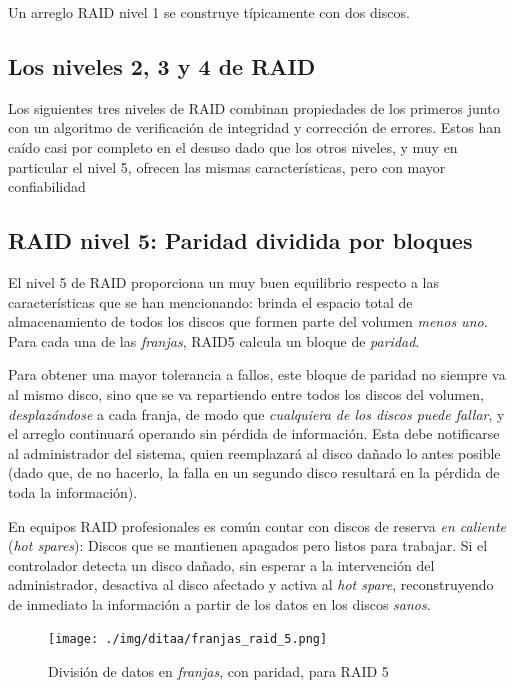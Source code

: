 \documentclass[11pt,fleqn]{book} %
\begin{document}
Un arreglo RAID nivel 1 se construye típicamente con dos discos.
\subsection{Los niveles 2, 3 y 4 de RAID}
\label{sec-10-2-3}


Los siguientes tres niveles de RAID combinan propiedades de los
primeros junto con un algoritmo de verificación de integridad y
corrección de errores. Estos han caído casi por completo en el desuso
dado que los otros niveles, y muy en particular el nivel 5, ofrecen
las mismas características, pero con mayor confiabilidad
\subsection{RAID nivel 5: Paridad dividida por bloques}
\label{sec-10-2-4}


El nivel 5 de RAID proporciona un muy buen equilibrio respecto a las
características que se han mencionando:  brinda el espacio total
de almacenamiento de todos los discos que formen parte del volumen
\emph{menos uno}. Para cada una de las \emph{franjas}, RAID5 calcula un bloque
de \emph{paridad}.

Para obtener una mayor tolerancia a fallos, este bloque de paridad no siempre va al mismo
disco, sino que se va repartiendo entre todos los discos del volumen,
\emph{desplazándose} a cada franja, de modo que \emph{cualquiera de los discos puede fallar}, y el arreglo continuará operando sin pérdida de
información. Esta debe notificarse al administrador del sistema,
quien reemplazará al disco dañado lo antes posible (dado que, de no
hacerlo, la falla en un segundo disco resultará en la pérdida de toda
la información).

En equipos RAID profesionales es común contar con discos de reserva
\emph{en caliente} (\emph{hot spares}): Discos que se mantienen apagados pero
listos para trabajar. Si el controlador detecta un disco dañado, sin
esperar a la intervención del administrador, desactiva al disco
afectado y activa al \emph{hot spare}, reconstruyendo de inmediato la
información a partir de los datos en los discos \emph{sanos}.

\begin{figure}[htb]
\centering
\texttt{[image: ./img/ditaa/franjas\_raid\_5.png]}
\caption{\label{FS_FIS_franjas_raid_5}División de datos en \emph{franjas}, con paridad, para RAID 5}
\end{figure}
\end{document}
